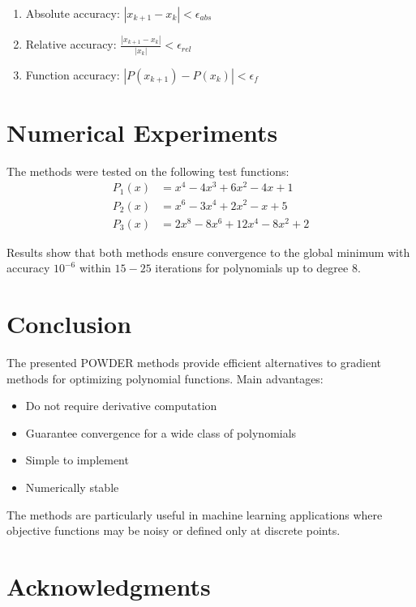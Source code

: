 \documentclass[12pt,a4paper]{article}
\begin{document}
\begin{enumerate}
    \item Absolute accuracy: $|x_{k+1} - x_k| < \epsilon_{abs}$
    \item Relative accuracy: $\frac{|x_{k+1} - x_k|}{|x_k|} < \epsilon_{rel}$
    \item Function accuracy: $|P(x_{k+1}) - P(x_k)| < \epsilon_f$
\end{enumerate}

\section{Numerical Experiments}

The methods were tested on the following test functions:
\begin{align}
    P_1(x) &= x^4 - 4x^3 + 6x^2 - 4x + 1 \\
    P_2(x) &= x^6 - 3x^4 + 2x^2 - x + 5 \\
    P_3(x) &= 2x^8 - 8x^6 + 12x^4 - 8x^2 + 2
\end{align}

Results show that both methods ensure convergence to the global minimum with accuracy $10^{-6}$ within $15-25$ iterations for polynomials up to degree 8.

\section{Conclusion}

The presented POWDER methods provide efficient alternatives to gradient methods for optimizing polynomial functions. Main advantages:

\begin{itemize}
    \item Do not require derivative computation
    \item Guarantee convergence for a wide class of polynomials
    \item Simple to implement
    \item Numerically stable
\end{itemize}

The methods are particularly useful in machine learning applications where objective functions may be noisy or defined only at discrete points.

\section*{Acknowledgments}
\end{document}
